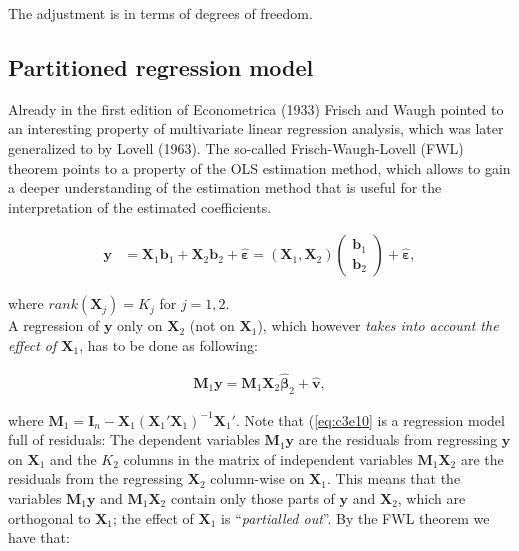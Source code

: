 \documentclass[]{book}
\theoremstyle{definition}
\theoremstyle{definition}
\theoremstyle{definition}
\theoremstyle{remark}
\begin{document}
The adjustment is in terms of degrees of freedom.

\hypertarget{partitioned-regression-model}{%
\subsection*{Partitioned regression model}\label{partitioned-regression-model}}

Already in the first edition of Econometrica (1933) Frisch and Waugh
pointed to an interesting property of multivariate linear regression
analysis, which was later generalized to by Lovell (1963). The so-called
Frisch-Waugh-Lovell (FWL) theorem points to a property of the OLS
estimation method, which allows to gain a deeper understanding of the
estimation method that is useful for the interpretation of the estimated
coefficients.

\[
\begin{align*}
  \mathbf{y} &= \mathbf{X}_1\mathbf{b}_1+\mathbf{X}_2\mathbf{b}_2+\hat{\boldsymbol{\varepsilon}} =  (\mathbf{X}_1,\mathbf{X}_2)\left(\begin{matrix}\mathbf{b}_1\\\mathbf{b}_2\end{matrix}\right)+\hat{\boldsymbol{\varepsilon}},
\label{eq:c3e9}
\end{align*}
\]

where \(rank(\mathbf{X}_j)=K_j\) for \(j=1,2\).\\
A regression of \(\mathbf{y}\) only on \(\mathbf{X}_2\) (not on \(\mathbf{X}_1\)), which
however \emph{takes into account the effect of \(\mathbf{X}_1\)}, has to be done as
following:

\[
\begin{align*}
  \mathbf{M}_1\mathbf{y} = \mathbf{M}_1\mathbf{X}_2\hat{\boldsymbol{\beta}}_2+\hat{\mathbf{v}},
\label{eq:c3e10}
\end{align*}
\]

where \(\mathbf{M}_1=\mathbf{I}_n-\mathbf{X}_1(\mathbf{X}_1'\mathbf{X}_1)^{-1}\mathbf{X}_1'\). Note that (\eqref{eq:c3e10} is a regression model full of residuals: The dependent variables \(\mathbf{M}_1\mathbf{y}\) are the residuals from regressing \(\mathbf{y}\) on \(\mathbf{X}_1\) and the \(K_2\) columns in the matrix of independent variables \(\mathbf{M}_1\mathbf{X}_2\) are the residuals from the regressing \(\mathbf{X}_2\) column-wise on \(\mathbf{X}_1\). This means that the variables \(\mathbf{M}_1\mathbf{y}\) and \(\mathbf{M}_1\mathbf{X}_2\) contain only those parts of \(\mathbf{y}\) and \(\mathbf{X}_2\), which are orthogonal to \(\mathbf{X}_1\); the effect of \(\mathbf{X}_1\) is ``\emph{partialled out}''. By the FWL theorem we have that:
\end{document}
